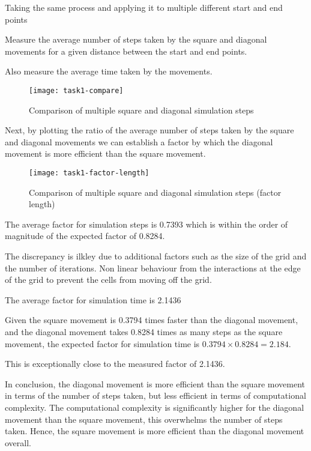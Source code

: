 \clearpage

Taking the same process and applying it to multiple different start and end points 

Measure the average number of steps taken by the square and diagonal movements for a given distance between the start and end points.

Also measure the average time taken by the movements.




\begin{figure}[ht]
    \centering
    \texttt{[image: task1-compare]}
    \caption[Comparison of multiple square and diagonal simulation steps]{Comparison of multiple square and diagonal simulation steps}
    \label{fig:task1-compare}
\end{figure}

Next, by plotting the ratio of the average number of steps taken by the square and diagonal movements we can establish a factor by which the diagonal movement is more efficient than the square movement.

\begin{figure}[ht]
    \centering
    \texttt{[image: task1-factor-length]}
    \caption[Comparison of multiple square and diagonal simulation steps (factor length)]{Comparison of multiple square and diagonal simulation steps (factor length)}
    \label{fig:task1-factor-length}
\end{figure}

The average factor for simulation steps is 0.7393 which is within the order of magnitude of the expected factor of 0.8284.

The discrepancy is ilkley due to additional factors such as the size of the grid and the number of iterations.
Non linear behaviour from the interactions at the edge of the grid to prevent the cells from moving off the grid.


The average factor for simulation time is 2.1436

Given the square movement is 0.3794 times faster than the diagonal movement,
and the diagonal movement takes 0.8284 times as many steps as the square movement,
the expected factor for simulation time is $0.3794 \times 0.8284 = 2.184$.

This is exceptionally close to the measured factor of 2.1436.


In conclusion, the diagonal movement is more efficient than the square movement in terms of the number of steps taken, but less efficient in terms of computational complexity. The computational complexity is significantly higher for the diagonal movement than the square movement, this overwhelms the number of steps taken. Hence, the square movement is more efficient than the diagonal movement overall.

\clearpage